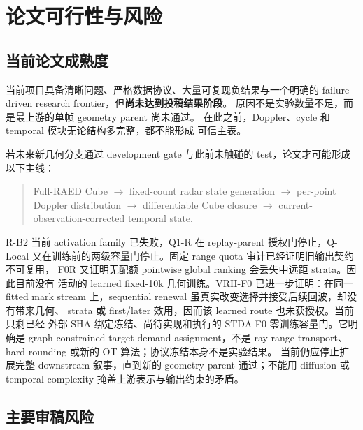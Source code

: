 \documentclass[11pt,a4paper,fontset=none]{ctexart}
\begin{document}
\section{论文可行性与风险}

\subsection{当前论文成熟度}

当前项目具备清晰问题、严格数据协议、大量可复现负结果与一个明确的
failure-driven research frontier，但\textbf{尚未达到投稿结果阶段}。
原因不是实验数量不足，而是最上游的单帧 geometry parent 尚未通过。
在此之前，Doppler、cycle 和 temporal 模块无论结构多完整，都不能形成
可信主表。

若未来新几何分支通过 development gate 与此前未触碰的 test，论文才可能形成以下主线：
\begin{quote}
Full-RAED Cube $\rightarrow$ fixed-count radar state generation
$\rightarrow$ per-point Doppler distribution
$\rightarrow$ differentiable Cube closure
$\rightarrow$ current-observation-corrected temporal state.
\end{quote}
R-B2 当前 activation family 已失败，Q1-R 在 replay-parent 授权门停止，Q-Local
又在训练前的两级容量门停止。固定 range quota 审计已经证明旧输出契约不可复用，
F0R 又证明无配额 pointwise global ranking 会丢失中远距 strata。因此目前没有
活动的 learned fixed-10k 几何训练。VRH-F0 已进一步证明：在同一 fitted mark
stream 上，sequential renewal 虽真实改变选择并接受后续回波，却没有带来几何、
strata 或 first/later 效用，因而该 learned route 也未获授权。当前只剩已经
外部 SHA 绑定冻结、尚待实现和执行的 STDA-F0 零训练容量门。它明确是
graph-constrained target-demand assignment，不是 ray-range transport、hard
rounding 或新的 OT 算法；协议冻结本身不是实验结果。
当前仍应停止扩展完整 downstream 叙事，直到新的 geometry parent 通过；不能用
diffusion 或 temporal complexity 掩盖上游表示与输出约束的矛盾。

\subsection{主要审稿风险}
\end{document}
